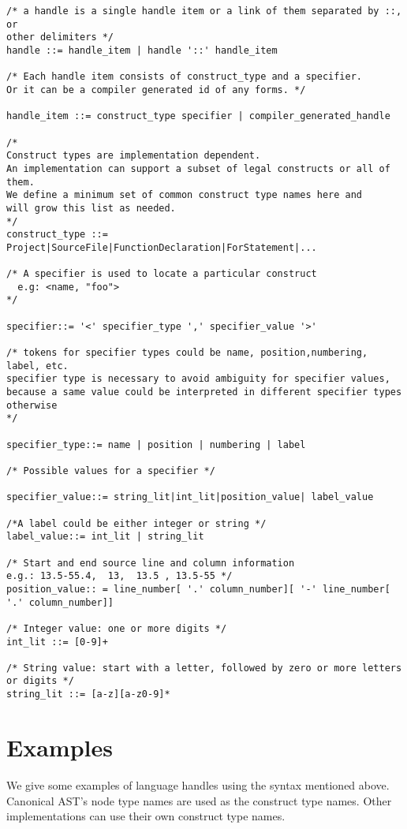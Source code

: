 \begin{verbatim}
/* a handle is a single handle item or a link of them separated by ::, or
other delimiters */
handle ::= handle_item | handle '::' handle_item

/* Each handle item consists of construct_type and a specifier. 
Or it can be a compiler generated id of any forms. */

handle_item ::= construct_type specifier | compiler_generated_handle

/* 
Construct types are implementation dependent.
An implementation can support a subset of legal constructs or all of them.
We define a minimum set of common construct type names here and 
will grow this list as needed.
*/
construct_type ::= Project|SourceFile|FunctionDeclaration|ForStatement|...

/* A specifier is used to locate a particular construct
  e.g: <name, "foo">
*/

specifier::= '<' specifier_type ',' specifier_value '>'                

/* tokens for specifier types could be name, position,numbering, label, etc. 
specifier type is necessary to avoid ambiguity for specifier values, 
because a same value could be interpreted in different specifier types otherwise
*/

specifier_type::= name | position | numbering | label 

/* Possible values for a specifier */

specifier_value::= string_lit|int_lit|position_value| label_value

/*A label could be either integer or string */
label_value::= int_lit | string_lit

/* Start and end source line and column information 
e.g.: 13.5-55.4,  13,  13.5 , 13.5-55 */
position_value:: = line_number[ '.' column_number][ '-' line_number[ '.' column_number]]

/* Integer value: one or more digits */
int_lit ::= [0-9]+

/* String value: start with a letter, followed by zero or more letters or digits */
string_lit ::= [a-z][a-z0-9]*

\end{verbatim}

\section{Examples}
We give some examples of language handles using the syntax mentioned above. 
Canonical AST's node type names are used as the construct type names. 
Other implementations can use their own construct type names.

